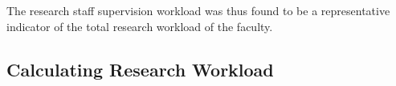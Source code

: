 The research staff supervision workload was thus found to be a representative indicator of the total research workload of the faculty.


\subsection{Calculating Research Workload}
\label{sec:calculating_research_workload}






